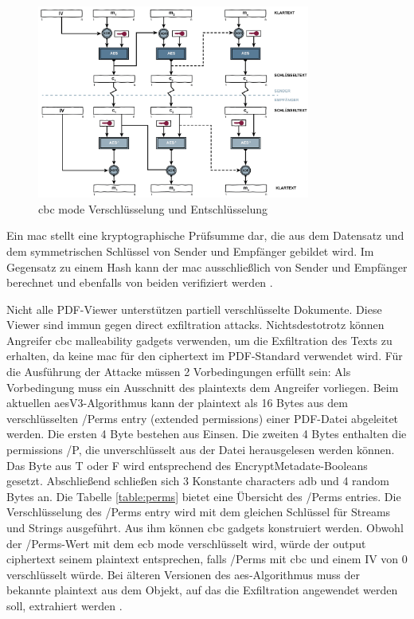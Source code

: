 \begin{figure}[!htbp]
	\centering
	\includegraphics[width=0.8\textwidth]{"images/cbc.png"}
	\caption{\gls{cbc} mode Verschlüsselung und Entschlüsselung \cite{cbc}}
	\label{fig:cbc}
\end{figure}

Ein \gls{mac} stellt eine kryptographische Prüfsumme dar, die aus dem Datensatz und dem symmetrischen Schlüssel von Sender und Empfänger gebildet wird. Im Gegensatz zu einem Hash kann der \gls{mac} ausschließlich von Sender und Empfänger berechnet und ebenfalls von beiden verifiziert werden \cite{crypto-web}.
\par
Nicht alle PDF-Viewer unterstützen partiell verschlüsselte Dokumente. Diese Viewer sind immun gegen direct exfiltration attacks. Nichtsdestotrotz können Angreifer \gls{cbc} malleability gadgets verwenden, um die Exfiltration des Texts zu erhalten, da keine \gls{mac} für den ciphertext im PDF-Standard verwendet wird. Für die Ausführung der Attacke müssen 2 Vorbedingungen erfüllt sein: Als Vorbedingung muss ein Ausschnitt des plaintexts dem Angreifer vorliegen. Beim aktuellen \gls{aes}V3-Algorithmus kann der plaintext als 16 Bytes aus dem verschlüsselten /Perms entry (extended permissions) einer PDF-Datei abgeleitet werden. Die ersten 4 Byte bestehen aus Einsen. Die zweiten 4 Bytes enthalten die permissions /P, die unverschlüsselt aus der Datei herausgelesen werden können. Das Byte aus T oder F wird entsprechend des EncryptMetadate-Booleans gesetzt. Abschließend schließen sich 3 Konstante characters adb und 4 random Bytes an. Die Tabelle \ref{table:perms} bietet eine Übersicht des /Perms entries. Die Verschlüsselung des /Perms entry wird mit dem gleichen Schlüssel für Streams und Strings ausgeführt. Aus ihm können \gls{cbc} gadgets konstruiert werden. Obwohl der /Perms-Wert mit dem \gls{ecb} mode verschlüsselt wird, würde der output ciphertext seinem plaintext entsprechen, falls /Perms mit \gls{cbc} und einem IV von 0 verschlüsselt würde. Bei älteren Versionen des \gls{aes}-Algorithmus muss der bekannte plaintext aus dem Objekt, auf das die Exfiltration angewendet werden soll, extrahiert werden \cite{ccc-break-pdf, pdfex}.

